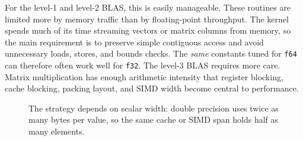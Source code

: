 \documentclass[11pt]{article}
\begin{document}
For the level-1 and level-2 BLAS, this is easily manageable. 
These routines are limited more by memory traffic than by floating-point
throughput. The kernel spends much of its time streaming vectors or matrix
columns from memory, so the main requirement is to preserve simple contiguous
access and avoid unnecessary loads, stores, and bounds checks. The \textit{same}
constants tuned for \texttt{f64} can therefore often work well for \texttt{f32}.
The level-3 BLAS requires more care. Matrix multiplication has enough arithmetic
intensity that register blocking, cache blocking, packing layout, and SIMD width
become central to performance. 

\begin{figure}[h]
\centering
{}

\caption{The strategy depends on scalar width: double precision uses twice
as many bytes per value, so the same cache or SIMD span holds half as many
elements.}
\label{fig:strategy}
\end{figure}
\end{document}
